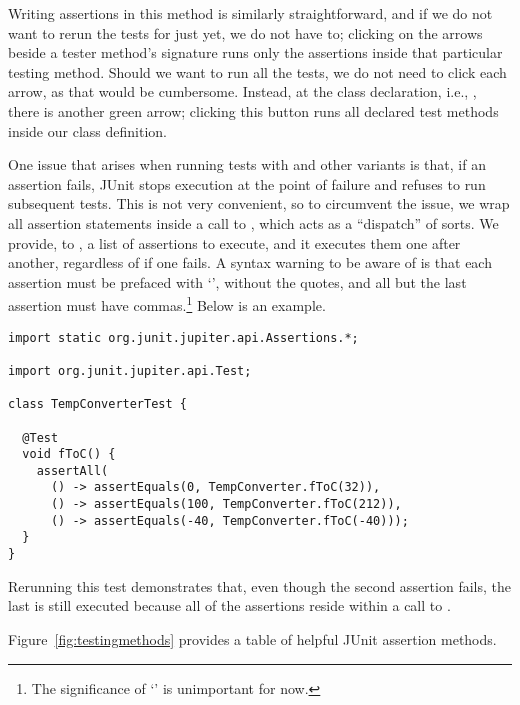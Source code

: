Writing assertions in this method is similarly straightforward, and if we do not want to rerun the tests for  just yet, we do not have to; clicking on the arrows beside a tester method's signature runs only the assertions inside that particular testing method. 
Should we want to run all the tests, we do not need to click each arrow, as that would be cumbersome. 
Instead, at the class declaration, i.e., , there is another green arrow; clicking this button runs all declared test methods inside our class definition.

One issue that arises when running tests with  and other variants is that, if an assertion fails, JUnit stops execution at the point of failure and refuses to run subsequent tests.
This is not very convenient, so to circumvent the issue, we wrap all assertion statements inside a call to , which acts as a ``dispatch'' of sorts. 
We provide, to , a list of assertions to execute, and it executes them one after another, regardless of if one fails. 
A syntax warning to be aware of is that each assertion must be prefaced with `\ttt{() -> }', without the quotes, and all but the last assertion must have commas.\footnote{The significance of `\ttt{() ->}' is unimportant for now.} 
Below is an example.

\begin{lstlisting}[language=MyJava]
import static org.junit.jupiter.api.Assertions.*;

import org.junit.jupiter.api.Test;
  
class TempConverterTest {

  @Test
  void fToC() {
    assertAll(
      () -> assertEquals(0, TempConverter.fToC(32)),
      () -> assertEquals(100, TempConverter.fToC(212)),
      () -> assertEquals(-40, TempConverter.fToC(-40)));
  }
}
\end{lstlisting}
Rerunning this test demonstrates that, even though the second assertion fails, the last is still executed because all of the assertions reside within a call to . 

Figure~\ref{fig:testingmethods} provides a table of helpful JUnit assertion methods.

